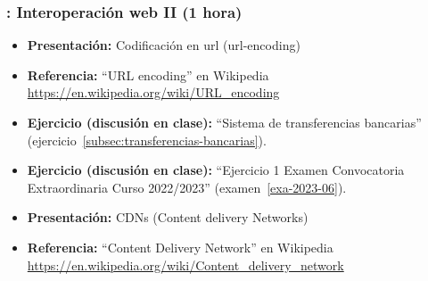\documentclass[a4paper,12pt]{article}
\begin{document}
\subsubsection{\martesG: Interoperación web II (1 hora)}

\begin{itemize}


\item \textbf{Presentación:} Codificación en url (url-encoding)
\item \textbf{Referencia:} ``URL encoding'' en Wikipedia \\ \url{https://en.wikipedia.org/wiki/URL_encoding}

\item \textbf{Ejercicio (discusión en clase):} ``Sistema de transferencias bancarias'' (ejercicio~\ref{subsec:transferencias-bancarias}).

\item \textbf{Ejercicio (discusión en clase):} ``Ejercicio 1 Examen Convocatoria Extraordinaria Curso 2022/2023'' (examen~\ref{exa-2023-06}).

\item \textbf{Presentación:} CDNs (Content delivery Networks)
\item \textbf{Referencia:} ``Content Delivery Network'' en Wikipedia \\ \url{https://en.wikipedia.org/wiki/Content_delivery_network}


\end{itemize}



\end{document}
